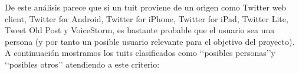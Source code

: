 De este análisis parece que si un tuit proviene de un origen como Twitter web client,
Twitter for Android, Twitter for iPhone, Twitter for iPad, Twitter Lite, Tweet Old Post
y VoiceStorm, es bastante probable que el usuario sea una persona (y por tanto un posible
usuario relevante para el objetivo del proyecto). A continuación mostramos
los tuits clasificados como \lq\lq posibles personas\rq\rq y \lq\lq posibles otros\rq\rq
atendiendo a este criterio:


